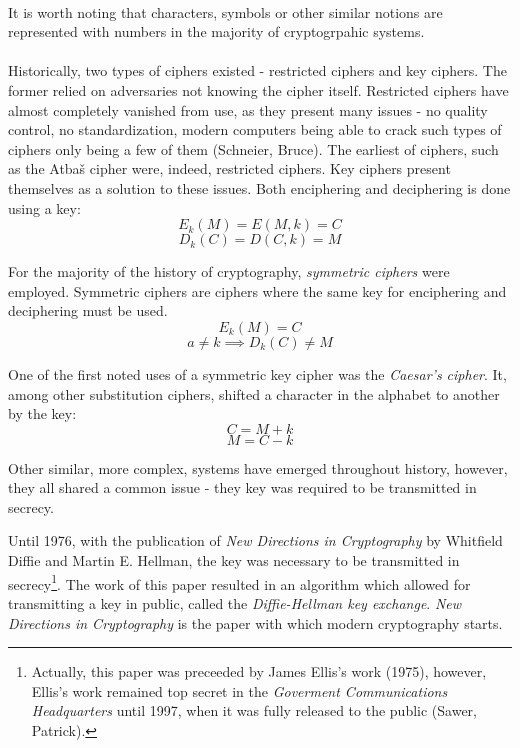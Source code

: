 \documentclass[a4paper, 12pt]{article}
\begin{document}
\paragraph*{}
It is worth noting that characters, symbols or other similar notions are represented with numbers in the majority of 
cryptogrpahic systems.

\paragraph*{}
Historically, two types of ciphers existed - restricted ciphers and key ciphers. The former relied on adversaries not 
knowing the cipher itself. Restricted ciphers have almost completely vanished from use, as they present many issues - 
no quality control, no standardization, modern computers being able to crack such types of ciphers only being a few of 
them (Schneier, Bruce). The earliest of ciphers, such as the Atba\v{s} cipher were, indeed, restricted ciphers. Key 
ciphers present themselves as a solution to these issues. Both enciphering and deciphering is done using a key:
$$E_k(M) = E(M, k) = C$$
$$D_k(C) = D(C, k) = M$$

For the majority of the history of cryptography, \textit{symmetric ciphers} were employed. Symmetric ciphers are 
ciphers where the same key for enciphering and deciphering must be used.
$$E_k(M) = C$$
$$a \neq k \implies D_k(C) \neq M$$

One of the first noted uses of a symmetric key cipher was the \textit{Caesar's cipher}. It, among other substitution 
ciphers, shifted a character in the alphabet to another by the key:
$$C = M + k$$
$$M = C - k$$

Other similar, more complex, systems have emerged throughout history, however, they all shared a common issue - they 
key was required to be transmitted in secrecy.

Until 1976, with the publication of \textit{New Directions in Cryptography} by Whitfield Diffie and Martin E. Hellman, 
the key was necessary to be transmitted in secrecy\footnote{Actually, this paper was preceeded by James Ellis's work 
(1975), however, Ellis's work remained top secret in the \textit{Goverment Communications Headquarters} until 1997, 
when it was fully released to the public (Sawer, Patrick).}. The work of this paper resulted in an algorithm which 
allowed for transmitting a key in public, called the \textit{Diffie-Hellman key exchange}. \textit{New Directions in 
Cryptography} is the paper with which modern cryptography starts.
\end{document}
